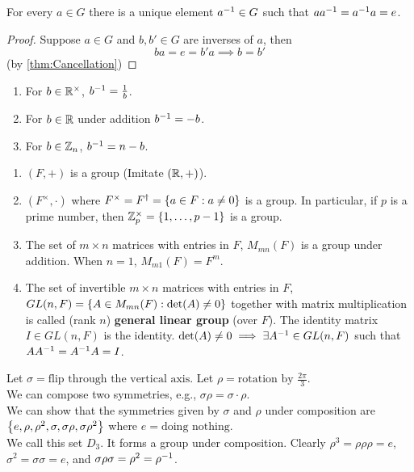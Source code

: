 \begin{theorem}
    For every $a \in G$ there is a unique element $a^{-1} \in G$ such that $a a^{-1} = a^{-1} a = e$.
\end{theorem}
\begin{proof}
    Suppose $a \in G$ and $b, b' \in G$ are inverses of $a$, then 
    $$ba = e = b'a \implies b = b'$$ (by \cref{thm:Cancellation})
\end{proof}

\begin{example}
    \spacebeforelist
    \begin{enumerate}
        \item For $b \in \mathbb{R}^\times$, $b^{-1} = \frac{1}{b}$.
        \item For $b \in \mathbb{R}$ under addition $b^{-1} = -b$.
        \item For $b \in \mathbb{Z}_n$, $b^{-1} = n - b$.
    \end{enumerate}
\end{example}

\begin{example}
    \spacebeforelist
    \begin{enumerate}
        \item $(F, +)$ is a group (Imitate $(\mathbb{R}, +)$).
        \item $(F^\times, \cdot)$ where $F^\times = F^\dag = \left\{a \in F: a \neq 0\right\}$ is a group. In particular, if $p$ is a prime number, then $\mathbb{Z}_p^\times = \left\{1, \dots, p - 1\right\}$ is a group.
        \item The set of $m \times n$ matrices with entries in $F$, $M_{mn}(F)$ is a group under addition. When $n=1$, $M_{m1}(F) = F^m$.
        \item The set of invertible $m \times n$ matrices with entries in $F$, $GL(n,F) = \left\{A \in M_{mn}(F): \mathrm{det}(A) \neq 0\right\}$ together with matrix multiplication is called (rank $n$) \textbf{general linear group} (over $F$). The identity matrix $I \in GL(n, F)$ is the identity. $\mathrm{det}(A) \neq 0 \implies \exists A^{-1} \in GL(n,F)$ such that $A A^{-1} = A^{-1} A = I$.
    \end{enumerate}
\end{example}

\begin{example}
    Let $\sigma = \text{flip through the vertical axis}$. Let $\rho = \text{rotation by } \frac{2\pi}{3}$. \\
    We can compose two symmetries, e.g., $\sigma\rho = \sigma \cdot \rho$. \\
    We can show that the symmetries given by $\sigma$ and $\rho$ under composition are $\left\{e, \rho, \rho^2, \sigma, \sigma\rho, \sigma\rho^2\right\}$ where $e = \text{doing nothing}$. \\
    We call this set $D_3$. It forms a group under composition. Clearly $\rho^3 = \rho\rho\rho = e$, $\sigma^2 = \sigma\sigma = e$, and $\sigma\rho\sigma = \rho^2 = \rho^{-1}$.
\end{example}

